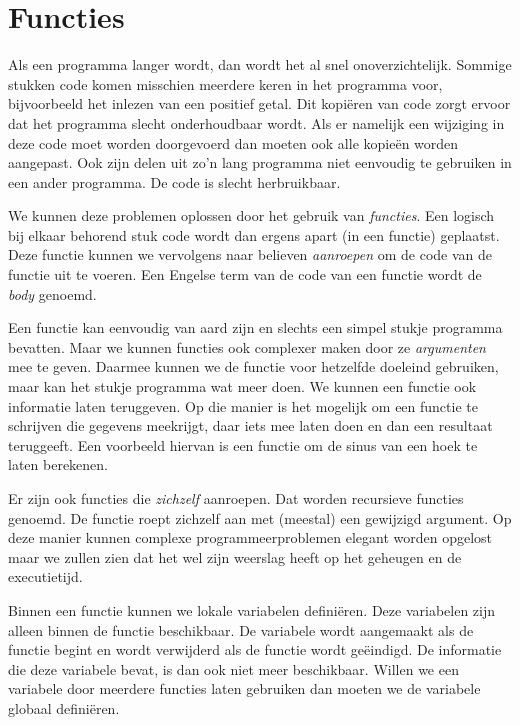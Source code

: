 \chapter{Functies}
\label{cha:functies}
\thispagestyle{empty}

Als een programma langer wordt, dan wordt het al snel onoverzichtelijk. Sommige stukken code komen misschien meerdere keren in het programma voor, bijvoorbeeld het inlezen van een positief getal. Dit kopiëren van code zorgt ervoor dat het programma slecht onderhoudbaar wordt. Als er namelijk een wijziging in deze code moet worden doorgevoerd dan moeten ook alle kopieën worden aangepast. Ook zijn delen uit zo'n lang programma niet eenvoudig te gebruiken in een ander programma. De code is slecht herbruikbaar.

We kunnen deze problemen oplossen door het gebruik van \textsl{functies}. Een logisch bij elkaar behorend stuk code wordt dan ergens apart (in een functie) geplaatst. Deze functie kunnen we vervolgens naar believen \textsl{aanroepen} om de code van de functie uit te voeren. Een Engelse term van de code van een functie wordt de \textsl{body} genoemd.

Een functie kan eenvoudig van aard zijn en slechts een simpel stukje programma bevatten. Maar we kunnen functies ook complexer maken door ze \textsl{argumenten} mee te geven. Daarmee kunnen we de functie voor hetzelfde doeleind gebruiken, maar kan het stukje programma wat meer doen. We kunnen een functie ook informatie laten teruggeven. Op die manier is het mogelijk om een functie te schrijven die gegevens meekrijgt, daar iets mee laten doen en dan een resultaat teruggeeft. Een voorbeeld hiervan is een functie om de sinus van een hoek te laten berekenen.

Er zijn ook functies die \textsl{zichzelf} aanroepen. Dat worden recursieve functies genoemd. De functie roept zichzelf aan met (meestal) een gewijzigd argument. Op deze manier kunnen complexe programmeerproblemen elegant worden opgelost maar we zullen zien dat het wel zijn weerslag heeft op het geheugen en de executietijd.

Binnen een functie kunnen we lokale variabelen definiëren. Deze variabelen zijn alleen binnen de functie beschikbaar. De variabele wordt aangemaakt als de functie begint en wordt verwijderd als de functie wordt geëindigd. De informatie die deze variabele bevat, is dan ook niet meer beschikbaar. Willen we een variabele door meerdere functies laten gebruiken dan moeten we de variabele globaal definiëren.

